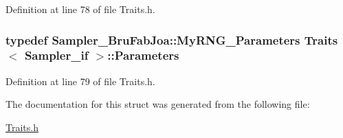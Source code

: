 Definition at line 78 of file Traits.\-h.

\hypertarget{struct_traits_3_01_sampler__if_01_4_a3e3228ca7fdd226d0a78be29ba406660}{
\subsubsection[{Parameters}]{\setlength{\rightskip}{0pt plus 5cm}typedef {\bf Sampler\-\_\-\-Bru\-Fab\-Joa\-::\-My\-R\-N\-G\-\_\-\-Parameters} {\bf Traits}$<$ {\bf Sampler\-\_\-if} $>$\-::{\bf Parameters}}}\label{struct_traits_3_01_sampler__if_01_4_a3e3228ca7fdd226d0a78be29ba406660}


Definition at line 79 of file Traits.\-h.



The documentation for this struct was generated from the following file\-:\begin{DoxyCompactItemize}
\item 
\hyperlink{_traits_8h}{Traits.\-h}\end{DoxyCompactItemize}
